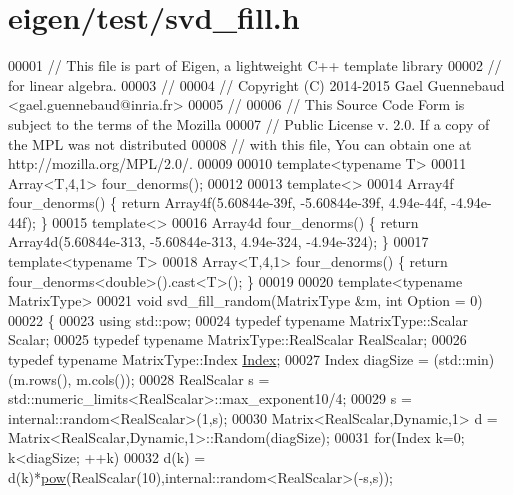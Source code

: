 \hypertarget{eigen_2test_2svd__fill_8h_source}{}\section{eigen/test/svd\+\_\+fill.h}
\label{eigen_2test_2svd__fill_8h_source}

\begin{DoxyCode}
00001 \textcolor{comment}{// This file is part of Eigen, a lightweight C++ template library}
00002 \textcolor{comment}{// for linear algebra.}
00003 \textcolor{comment}{//}
00004 \textcolor{comment}{// Copyright (C) 2014-2015 Gael Guennebaud <gael.guennebaud@inria.fr>}
00005 \textcolor{comment}{//}
00006 \textcolor{comment}{// This Source Code Form is subject to the terms of the Mozilla}
00007 \textcolor{comment}{// Public License v. 2.0. If a copy of the MPL was not distributed}
00008 \textcolor{comment}{// with this file, You can obtain one at http://mozilla.org/MPL/2.0/.}
00009 
00010 \textcolor{keyword}{template}<\textcolor{keyword}{typename} T>
00011 Array<T,4,1> four\_denorms();
00012 
00013 \textcolor{keyword}{template}<>
00014 Array4f four\_denorms() \{ \textcolor{keywordflow}{return} Array4f(5.60844e-39f, -5.60844e-39f, 4.94e-44f, -4.94e-44f); \}
00015 \textcolor{keyword}{template}<>
00016 Array4d four\_denorms() \{ \textcolor{keywordflow}{return} Array4d(5.60844e-313, -5.60844e-313, 4.94e-324, -4.94e-324); \}
00017 \textcolor{keyword}{template}<\textcolor{keyword}{typename} T>
00018 Array<T,4,1> four\_denorms() \{ \textcolor{keywordflow}{return} four\_denorms<double>().cast<T>(); \}
00019 
00020 \textcolor{keyword}{template}<\textcolor{keyword}{typename} MatrixType>
00021 \textcolor{keywordtype}{void} svd\_fill\_random(MatrixType &m, \textcolor{keywordtype}{int} Option = 0)
00022 \{
00023   \textcolor{keyword}{using} std::pow;
00024   \textcolor{keyword}{typedef} \textcolor{keyword}{typename} MatrixType::Scalar Scalar;
00025   \textcolor{keyword}{typedef} \textcolor{keyword}{typename} MatrixType::RealScalar RealScalar;
00026   \textcolor{keyword}{typedef} \textcolor{keyword}{typename} MatrixType::Index \hyperlink{namespace_eigen_a62e77e0933482dafde8fe197d9a2cfde}{Index};
00027   Index diagSize = (std::min)(m.rows(), m.cols());
00028   RealScalar s = std::numeric\_limits<RealScalar>::max\_exponent10/4;
00029   s = internal::random<RealScalar>(1,s);
00030   Matrix<RealScalar,Dynamic,1> d =  Matrix<RealScalar,Dynamic,1>::Random(diagSize);
00031   \textcolor{keywordflow}{for}(Index k=0; k<diagSize; ++k)
00032     d(k) = d(k)*\hyperlink{group___core___module_ab6dc101d82e8228a19a8840e3a29c1c9}{pow}(RealScalar(10),internal::random<RealScalar>(-s,s));

\end{DoxyCode}
